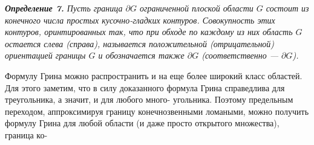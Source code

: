 \documentclass[10pt]{book}
\begin{document}
{    \textit{\textbf{Определение 7.} Пусть граница $\partial G$ ограниченной плоской \linebreak области $G$ состоит из конечного числа простых кусочно-гладких \linebreak контуров. Совокупность этих контуров, оринтированных так, что \linebreak при обходе по каждому из них область $G$ остается слева (справа), \linebreak называется положительной (отрицательной) ориентацией границы $G$ \linebreak и обозначается также $\partial G$ (соответственно --- $\partial G$).} \par

    Формулу Грина можно распространить и на еще более широкий \linebreak класс областей. Для этого заметим, что в силу доказанного формула \linebreak Грина справедлива для треугольника, а значит, и для любого много- \linebreak угольника. Поэтому предельным переходом, аппроксимируя границу \linebreak конечнозвенными ломаными, можно получить формулу Грина для \linebreak любой области (и даже просто открытого множества), граница ко- \linebreak}
\end{document}
